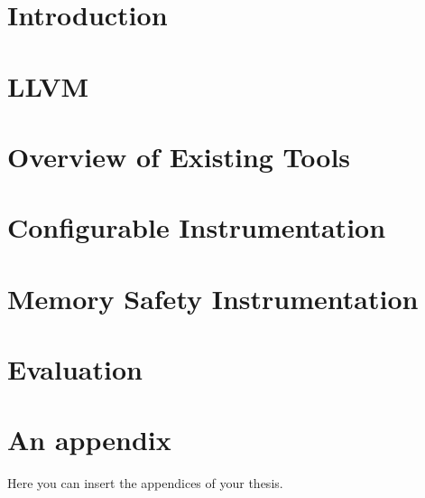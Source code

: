 \documentclass[
  digital, %
  table,   %
  lof,     %
  lot,     %
  nocover
]{fithesis3}
\begin{document}
\chapter{Introduction}


\chapter{LLVM}\label{chap:llvm}


\chapter{Overview of Existing Tools}\label{chap:tools}


\chapter{Configurable Instrumentation}\label{chap:instr}


\chapter{Memory Safety Instrumentation}\label{chap:memsafety}


\chapter{Evaluation}\label{chap:eval}

\printbibliography

\appendix %
\chapter{An appendix}
Here you can insert the appendices of your thesis.
\end{document}
